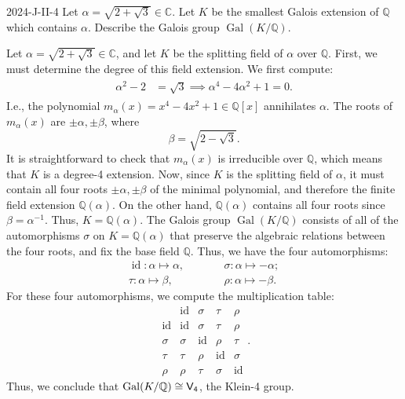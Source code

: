 \documentclass{article}
\begin{document}
	\begin{prb}{2024-J-II-4}
		Let $\alpha = \sqrt{2 + \sqrt{3}} \in \mathbb{C}$. Let $K$ be the smallest Galois extension of $\mathbb{Q}$ which contains $\alpha$. Describe the Galois group $\operatorname{Gal}(K/\mathbb{Q})$. 
	\end{prb}
	Let $\alpha = \sqrt{2 + \sqrt{3}} \in \mathbb{C}$, and let $K$ be the splitting field of $\alpha$ over $\mathbb{Q}$. First, we must determine the degree of this field extension. We first compute: 
	\begin{align*}
		\begin{split}
			\alpha^{2} - 2 &= \sqrt{3} \implies \alpha^{4} - 4\alpha^{2} + 1 = 0. 
		\end{split}
	\end{align*}
	I.e., the polynomial $m_{\alpha}(x) = x^{4} - 4x^{2} + 1 \in \mathbb{Q}[x]$ annihilates $\alpha$. The roots of $m_{\alpha}(x)$ are $\pm \alpha, \pm \beta$, where 
	\begin{equation*}
		\beta = \sqrt{2 - \sqrt{3}}. 
	\end{equation*}
	It is straightforward to check that $m_{\alpha}(x)$ is irreducible over $\mathbb{Q}$, which means that $K$ is a degree-4 extension. Now, since $K$ is the splitting field of $\alpha$, it must contain all four roots $\pm \alpha, \pm \beta$ of the minimal polynomial, and therefore the finite field extension $\mathbb{Q}(\alpha)$. On the other hand, $\mathbb{Q}(\alpha)$ contains all four roots since $\beta = \alpha^{-1}$. Thus, $K = \mathbb{Q}(\alpha)$. The Galois group $\operatorname{Gal}(K/\mathbb{Q})$ consists of all of the automorphisms $\sigma$ on $K = \mathbb{Q}(\alpha)$ that preserve the algebraic relations between the four roots, and fix the base field $\mathbb{Q}$. Thus, we have the four automorphisms: 
	\begin{equation*}
		\begin{matrix}
			\operatorname{id}: \alpha \mapsto \alpha, &\qquad & \sigma: \alpha \mapsto -\alpha; \\ 
			\tau: \alpha \mapsto \beta,& \qquad & \rho: \alpha \mapsto -\beta.
		\end{matrix}
	\end{equation*}
	For these four automorphisms, we compute the multiplication table: 
	\begin{equation*}
		\begin{array}{crrrr}
			& \operatorname{id} & \sigma & \tau & \rho \\
			\operatorname{id} & \operatorname{id} & \sigma & \tau & \rho \\
			\sigma & \sigma & \operatorname{id} & \rho  & \tau \\
			\tau & \tau & \rho & \operatorname{id} & \sigma \\
			\rho & \rho & \tau & \sigma & \operatorname{id}
		\end{array}.
	\end{equation*}
	Thus, we conclude that $\operatorname{Gal}(K/\mathbb{Q}) \cong \sf{V}_{4}$, the Klein-4 group. 
	
\end{document}
